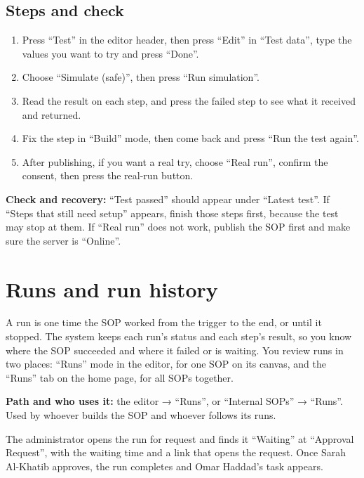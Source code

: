 \subsection{Steps and check}
\begin{enumerate}
\item Press “Test” in the editor header, then press “Edit” in “Test data”, type the values you want to try and press “Done”.
\item Choose “Simulate (safe)”, then press “Run simulation”.
\item Read the result on each step, and press the failed step to see what it received and returned.
\item Fix the step in “Build” mode, then come back and press “Run the test again”.
\item After publishing, if you want a real try, choose “Real run”, confirm the consent, then press the real-run button.
\end{enumerate}

\textbf{Check and recovery:} “Test passed” should appear under “Latest test”. If “Steps that still need setup” appears, finish those steps first, because the test may stop at them. If “Real run” does not work, publish the SOP first and make sure the server is “Online”.

\clearpage
\section{Runs and run history}
\label{sec:builder-feature-isop-runs}

A run is one time the SOP worked from the trigger to the end, or until it stopped. The system keeps each run's status and each step's result, so you know where the SOP succeeded and where it failed or is waiting. You review runs in two places: “Runs” mode in the editor, for one SOP on its canvas, and the “Runs” tab on the home page, for all SOPs together.

\textbf{Path and who uses it:} the editor → “Runs”, or “Internal SOPs” → “Runs”. Used by whoever builds the SOP and whoever follows its runs.

\begin{rcnote}
The administrator opens the run for request  and finds it “Waiting” at “Approval Request”, with the waiting time and a link that opens the request. Once Sarah Al-Khatib approves, the run completes and Omar Haddad's task appears.
\end{rcnote}


